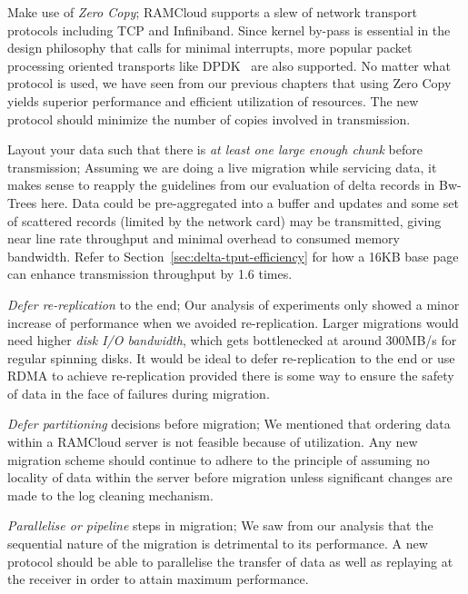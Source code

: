 \begin{myitemize}
\item Make use of {\em Zero Copy}; RAMCloud supports a slew of network transport protocols including TCP and Infiniband. Since kernel by-pass is essential in the design philosophy that calls for minimal 
interrupts, more popular packet processing oriented transports like DPDK~\cite{dpdk} are also supported. No matter what protocol is used, we have seen from our previous chapters that 
using Zero Copy yields superior performance and efficient utilization of resources. The new protocol should minimize the number of copies involved in transmission.

\item Layout your data such that there is {\em at least one large enough chunk} before transmission; Assuming we are doing a live migration while servicing data, it makes sense to reapply the guidelines 
from our evaluation of delta records in Bw-Trees here. Data could be pre-aggregated into a buffer
 and updates and some set of scattered records (limited by the network card) may be 
 transmitted, giving near line rate throughput and minimal overhead to consumed 
 memory bandwidth. Refer to Section~\ref{sec:delta-tput-efficiency} for how a 16KB 
 base page can enhance transmission throughput by 1.6 times.

\item {\em Defer re-replication} to the end; Our analysis of experiments only showed a minor increase of performance when we avoided re-replication. 
Larger migrations would need higher {\em disk I/O bandwidth}, which gets bottlenecked at around 
300MB/s for regular spinning disks. It would be ideal to defer re-replication to the end or use RDMA to achieve re-replication 
provided there is some way to ensure the safety of data in the face of failures during migration.

\item {\em Defer partitioning} decisions before migration; We mentioned that ordering data within a RAMCloud server is not feasible because of utilization. Any new migration scheme should continue to adhere to the principle of assuming no locality 
of data within the server before migration unless significant changes are made to the log cleaning mechanism.

\item {\em Parallelise or pipeline} steps in migration; We saw from our analysis that the sequential nature of the migration is detrimental to its performance. A new protocol should be 
able to parallelise the transfer of data as well as replaying at the receiver in order to attain maximum performance. 

\end{myitemize}
\newpage




